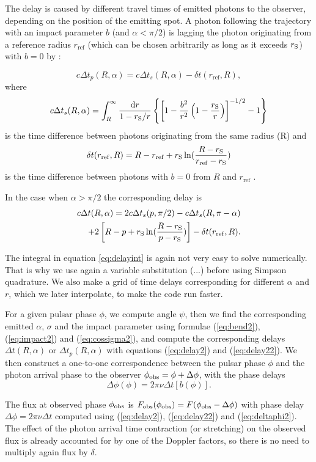 \documentclass{wihuri}
\def\rg{r_{\rm S}} %
\def\be{\begin{equation}}
\def\ee{\end{equation}}
\def\d{{\rm d}}
\def\rg{r_{\rm S}} %
\def\phiobs{\phi_{\rm obs}}
\begin{document}
   
The delay is caused by different travel times of emitted
photons to the observer, depending on the position of the emitting spot.
A photon following the trajectory with an impact parameter $b$ (and $\alpha < \pi/2$)
is lagging the photon originating from a reference radius $r_{\mathrm{ref}}$ (which can be chosen arbitrarily as long as it exceeds $\rg$) with $b=0$ by \cite{pechenick}%
:

\be \label{eq:delay2}
c\Delta t_{p}(R,\alpha)=  c\Delta t_{s}(R,\alpha) -\delta t(r_{\mathrm{ref}},R),
\ee
where 
\be \label{eq:delayint}
c\Delta t_{s}(R,\alpha) =
\int_R^{\infty} \frac{\d r}{1- \rg/r}
\left\{ \left[ 1-  \frac{b^2}{r^2}  \left( 1- \frac{\rg}{r} \right)
\right] ^{-1/2}  -1 \right\}
\ee
is the time difference between photons originating from the same radius (R) and
\be
\delta t(r_{\mathrm{ref}},R) = R-r_{\mathrm{ref}}+\rg\ln(\frac{R-\rg}{r_{\mathrm{ref}}-\rg})
\ee
is the time difference between photons with $b=0$ from $R$ and $r_{\mathrm{ref}}$ \cite{falkner}. 

In the case when $\alpha > \pi/2$ the corresponding delay is
\be\label{eq:delay22}
\begin{split}
c\Delta t(R,\alpha)= 2c\Delta t_{s}(p,\pi/2)-c\Delta t_{s}(R,\pi-\alpha)\\+2\left[ R-p+\rg\ln(\frac{R-\rg}{p-\rg})\right]-\delta t(r_{\mathrm{ref}},R).
\end{split}
\ee

The integral in equation \ref{eq:delayint} is again not very easy to solve numerically. That is why we use again a variable substitution (...) before using Simpson quadrature. We also make a grid of time delays corresponding for different $\alpha$ and $r$, which we later interpolate, to make the code run faster.

For a given pulsar phase $\phi$, we compute angle $\psi$, then
we find the corresponding emitted $\alpha$, $\sigma$ and the impact parameter
using  formulae (\ref{eq:bend2}), (\ref{eq:impact2}) and (\ref{eq:cossigma2}), and
  compute the corresponding  delays $\Delta t(R,\alpha)$ or $\Delta t_{p}(R,\alpha)$
with equations  (\ref{eq:delay2}) and (\ref{eq:delay22}).
We then construct a one-to-one
correspondence between the pulsar phase $\phi$ and
the photon arrival phase to the observer $\phiobs=\phi+ \Delta\phi$,
with the phase delays
\be \label{eq:deltaphi2}
\Delta \phi(\phi) =2\pi\nu \Delta t[b(\phi)] .
\ee

The flux at observed phase $\phiobs$ is
${F}_{\rm obs}(\phiobs)=F(\phiobs-\Delta\phi)$ with
phase delay  $\Delta \phi=2\pi\nu\Delta t$
computed using (\ref{eq:delay2}), (\ref{eq:delay22}) and (\ref{eq:deltaphi2}).
The effect of the photon arrival time contraction (or stretching) on
the observed flux is already accounted for by one of the Doppler factors, 
so there is no need to multiply again flux by $\delta$.
\end{document}
